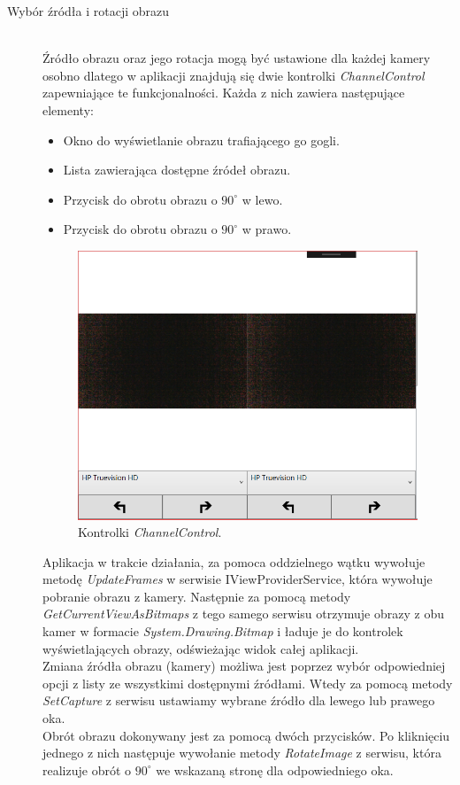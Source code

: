 \documentclass[a4paper,11pt,twoside]{report}
\theoremstyle{definition}
\begin{document}
\begin{description}
\item [Wybór źródła i rotacji obrazu] \hfill \\

Źródło obrazu oraz jego rotacja mogą być ustawione dla każdej kamery osobno dlatego w aplikacji znajdują się dwie kontrolki \textit{ChannelControl} zapewniające te funkcjonalności. Każda z nich zawiera  następujące elementy:

\begin{itemize}
\item Okno do wyświetlanie obrazu trafiającego go gogli.
\item Lista zawierająca dostępne źródeł obrazu.
\item Przycisk do obrotu obrazu o $90^\circ$ w lewo.
\item Przycisk do obrotu obrazu o $90^\circ$ w prawo.
\end{itemize}

\begin{figure}[h]
\centering
\includegraphics[scale=0.5]{images/channelcontrol_screen}
\caption[Widok aplikacji]{Kontrolki \textit{ChannelControl}.}
\end{figure}

Aplikacja w trakcie działania, za pomoca oddzielnego wątku wywołuje metodę \textit{UpdateFrames} w serwisie {IViewProviderService}, która wywołuje pobranie obrazu z kamery. Następnie za pomocą metody \textit{GetCurrentViewAsBitmaps} z tego samego serwisu otrzymuje obrazy z obu kamer w formacie \textit{System.Drawing.Bitmap} i ładuje je do kontrolek wyświetlających obrazy, odświeżając widok całej aplikacji. \\
Zmiana źródła obrazu (kamery) możliwa jest poprzez wybór odpowiedniej opcji z listy ze wszystkimi dostępnymi źródłami. Wtedy za pomocą metody \textit{SetCapture} z serwisu ustawiamy wybrane źródło dla lewego lub prawego oka. \\
Obrót obrazu dokonywany jest za pomocą dwóch przycisków. Po kliknięciu jednego z nich następuje wywołanie metody \textit{RotateImage} z serwisu, która realizuje obrót o $90^\circ$ we wskazaną stronę dla odpowiedniego oka.


\end{description}
\end{document}
